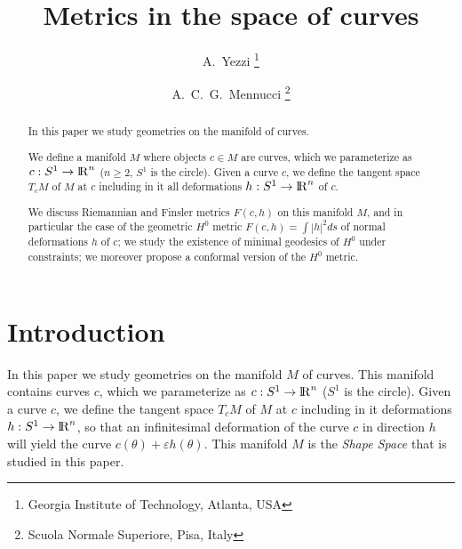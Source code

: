 \documentclass[twoside,a4paper,english]{article}
\begin{document}
{\insert{}}


\title{Metrics in the space of curves}
\author{A.~Yezzi \thanks{Georgia Institute of Technology, Atlanta, USA}
  \and
  A.~C.~G.~Mennucci \thanks{Scuola Normale Superiore, Pisa, Italy}}
\date{}
\maketitle

\begin{abstract}
  In this paper we study geometries on the manifold of curves.

  We define a manifold $M$ where objects $c\in M$ are curves, which we
  parameterize as $c:S^1\to {\protect\mathrm{l\hskip-0.15em R}}^n$ ($n\ge 2$, $S^1$ is the circle).
  Given a curve $c$, we define the tangent space $T_cM$ of $M$ at $c$
  including in it all deformations $h:S^1\to{\protect\mathrm{l\hskip-0.15em R}}^n$ of $c$.

  We discuss Riemannian and Finsler metrics $F(c,h)$ on this manifold
  $M$, and in particular the case of the geometric $H^0$ metric
  $F(c,h)=\int |h|^2ds$ of normal deformations $h$ of $c$; we study
  the existence of minimal geodesics of $H^0$ under constraints; we
  moreover propose a conformal version of the $H^0$ metric.
\end{abstract}

\section{Introduction}

In this paper we study geometries on the manifold $M$ of curves.
This manifold contains curves $c$, which we parameterize as 
$c:S^1\to {\protect\mathrm{l\hskip-0.15em R}}^n$ ($S^1$ is the circle).
Given a curve $c$,
we define the tangent space $T_cM$ of $M$ at $c$ including in it 
deformations $h:S^1\to{\protect\mathrm{l\hskip-0.15em R}}^n$, so that an infinitesimal deformation of the
curve $c$ in direction $h$ will yield the curve 
$c(\theta)+\varepsilon h(\theta)$. 
This manifold $M$ is  the \emph{Shape Space} that is studied in
this paper.
\end{document}
